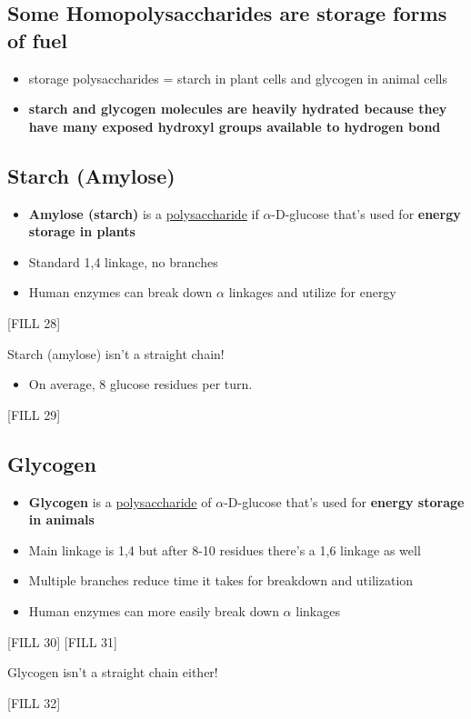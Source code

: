 \documentclass[10pt]{article}
\begin{document}
\subsection*{Some Homopolysaccharides are storage forms of fuel}
\begin{itemize}
    \item storage polysaccharides = starch in plant cells and glycogen in animal cells
    \item \textbf{starch and glycogen molecules are heavily hydrated because they have many exposed hydroxyl groups available to hydrogen bond}
\end{itemize}

\subsection*{Starch (Amylose)}
\begin{itemize}
    \item \textbf{Amylose (starch)} is a \underline{polysaccharide} if $\alpha$-D-glucose that's used for \textbf{energy storage in plants}
    \item Standard 1,4 linkage, no branches
    \item Human enzymes can break down $\alpha$ linkages and utilize for energy
\end{itemize}
\begin{center}
    [FILL 28]
\end{center}
Starch (amylose) isn't a straight chain!
\begin{itemize}
    \item On average, 8 glucose residues per turn.
\end{itemize}
\begin{center}
    [FILL 29]
\end{center}

\subsection*{Glycogen}
\begin{itemize}
    \item \textbf{Glycogen} is a \underline{polysaccharide} of $\alpha$-D-glucose that's used for \textbf{energy storage in animals}
    \item Main linkage is 1,4 but after 8-10 residues there's a 1,6 linkage as well
    \item Multiple branches reduce time it takes for breakdown and utilization
    \item Human enzymes can more easily break down $\alpha$ linkages
\end{itemize}
\begin{center}
    [FILL 30]
    [FILL 31]
\end{center}
Glycogen isn't a straight chain either!
\begin{center}
    [FILL 32]
\end{center}
\end{document}
